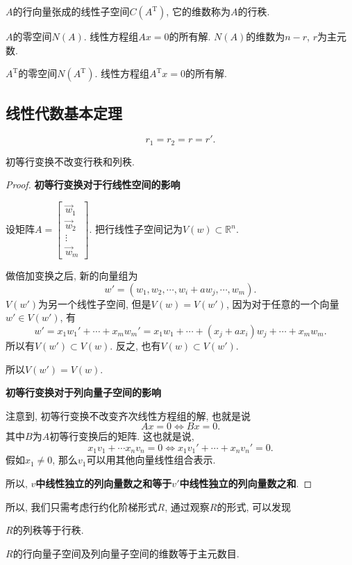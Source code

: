 $A$的行向量张成的线性子空间$C(A^{\mathrm{T}})$, 它的维数称为$A$的行秩.

$A$的零空间$N(A)$. 线性方程组$Ax=0$的所有解. $N(A)$的维数为$n-r$, $r$为主元数.

$A^{\mathrm{T}}$的零空间$N(A^{\mathrm{T}})$. 线性方程组$A^{\mathrm{T}}x = 0$的所有解.

\subsection{线性代数基本定理}
\begin{theorem}
    \begin{equation}
      r_1=r_2=r=r'.
    \end{equation}
\end{theorem}
\begin{proposition}
    初等行变换不改变行秩和列秩.
\end{proposition}
\begin{proof}
 
    \textbf{初等行变换对于行线性空间的影响}

    设矩阵$A = \begin{bmatrix} 
    \vec{w}_1 \\ 
    \vec{w}_2 \\ 
    \vdots \\ 
    \vec{w}_m 
    \end{bmatrix}$.
    把行线性子空间记为$V(w) \subset \mathbb{R}^{n}$.

    做倍加变换之后, 新的向量组为
    \begin{equation}
      w' = (w_1,w_2,\cdots,w_i+a w_j ,\cdots,w_m).
    \end{equation}
    $V(w')$为另一个线性子空间, 但是$V(w)=V(w')$, 因为对于任意的一个向量$w' \in V(w')$, 有
    \begin{equation}
      w'=x_1w_1'+ \cdots +x_m w_m' = x_1 w_1 + \cdots +(x_j+ ax_i)w_j+ \cdots +x_m w_m.
    \end{equation}
    所以有$V(w') \subset V(w)$. 反之, 也有$V(w) \subset V(w')$.

    所以$V(w')=V(w)$.

    \textbf{初等行变换对于列向量子空间的影响}

    注意到, 初等行变换不改变齐次线性方程组的解, 也就是说
    \begin{equation}
      Ax=0 \iff Bx=0.
    \end{equation}
    其中$B$为$A$初等行变换后的矩阵. 这也就是说, 
    \begin{equation}
      x_1v_1+ \cdots x_n v_n=0 \iff x_1 v_1' + \cdots +x_n v_n ' = 0.
    \end{equation}
    假如$x_1\neq 0$, 那么$v_1$可以用其他向量线性组合表示.

    所以, \textbf{$v$中线性独立的列向量数之和等于$v'$中线性独立的列向量数之和}.

\end{proof}

所以, 我们只需考虑行约化阶梯形式$R$, 通过观察$R$的形式, 可以发现

$R$的列秩等于行秩.

$R$的行向量子空间及列向量子空间的维数等于主元数目.


